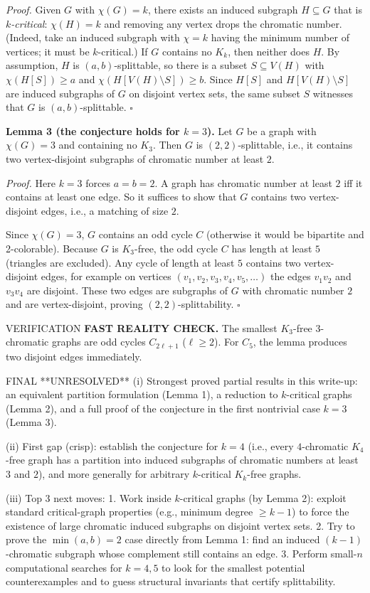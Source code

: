 \emph{Proof.}
Given $G$ with $\chi(G)=k$, there exists an induced subgraph $H\subseteq G$ that is
\emph{$k$-critical}: $\chi(H)=k$ and removing any vertex drops the chromatic number.
(Indeed, take an induced subgraph with $\chi=k$ having the minimum number of
vertices; it must be $k$-critical.)
If $G$ contains no $K_k$, then neither does $H$.
By assumption, $H$ is $(a,b)$-splittable, so there is a subset
$S\subseteq V(H)$ with $\chi(H[S])\ge a$ and $\chi(H[V(H)\setminus S])\ge b$.
Since $H[S]$ and $H[V(H)\setminus S]$ are induced subgraphs of $G$ on disjoint
vertex sets, the same subset $S$ witnesses that $G$ is $(a,b)$-splittable.
\hfill $\square$

\medskip
\textbf{Lemma 3 (the conjecture holds for $k=3$).}
Let $G$ be a graph with $\chi(G)=3$ and containing no $K_3$.
Then $G$ is $(2,2)$-splittable, i.e., it contains two vertex-disjoint subgraphs
of chromatic number at least $2$.

\emph{Proof.}
Here $k=3$ forces $a=b=2$.
A graph has chromatic number at least $2$ iff it contains at least one edge.
So it suffices to show that $G$ contains two vertex-disjoint edges, i.e., a
matching of size $2$.

Since $\chi(G)=3$, $G$ contains an odd cycle $C$ (otherwise it would be bipartite
and 2-colorable). Because $G$ is $K_3$-free, the odd cycle $C$ has length at
least $5$ (triangles are excluded).
Any cycle of length at least $5$ contains two vertex-disjoint edges, for example
on vertices $(v_1,v_2,v_3,v_4,v_5,\dots)$ the edges $v_1v_2$ and $v_3v_4$ are
disjoint.
These two edges are subgraphs of $G$ with chromatic number $2$ and are
vertex-disjoint, proving $(2,2)$-splittability.
\hfill $\square$

VERIFICATION
\textbf{FAST REALITY CHECK.}
The smallest $K_3$-free $3$-chromatic graphs are odd cycles $C_{2\ell+1}$
($\ell\ge2$). For $C_5$, the lemma produces two disjoint edges immediately.

FINAL
**UNRESOLVED**
(i) Strongest proved partial results in this write-up: an equivalent partition
formulation (Lemma 1), a reduction to $k$-critical graphs (Lemma 2), and a full
proof of the conjecture in the first nontrivial case $k=3$ (Lemma 3).

(ii) First gap (crisp): establish the conjecture for $k=4$ (i.e., every
$4$-chromatic $K_4$-free graph has a partition into induced subgraphs of
chromatic numbers at least $3$ and $2$), and more generally for arbitrary
$k$-critical $K_k$-free graphs.

(iii) Top 3 next moves:
1. Work inside $k$-critical graphs (by Lemma 2): exploit standard critical-graph
properties (e.g., minimum degree $\ge k-1$) to force the existence of large
chromatic induced subgraphs on disjoint vertex sets.
2. Try to prove the $\min(a,b)=2$ case directly from Lemma 1: find an induced
$(k-1)$-chromatic subgraph whose complement still contains an edge.
3. Perform small-$n$ computational searches for $k=4,5$ to look for the smallest
potential counterexamples and to guess structural invariants that certify
splittability.

